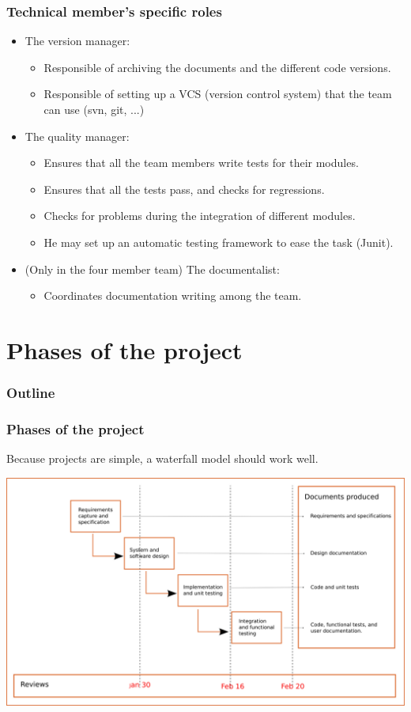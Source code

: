 \documentclass[10pt]{beamer}
\begin{document}
\begin{frame}
  \frametitle{Technical member's specific roles}
  \begin{itemize}
  \item The version manager:
    \begin{itemize}
    \item Responsible of archiving the documents and the different code versions.
    \item Responsible of setting up a VCS (version control system) that the team
      can use (svn, git, ...)
    \end{itemize}
  \item The quality manager:
    \begin{itemize}
    \item Ensures that all the team members write tests for their modules.
    \item Ensures that all the tests pass, and checks for regressions.
    \item Checks for problems during the integration of different modules.
    \item He may set up an automatic testing framework to ease the task (Junit).
    \end{itemize}

  \item (Only in the four member team) The documentalist:
    \begin{itemize}
    \item Coordinates documentation writing among the team.
    \end{itemize}
  \end{itemize}
\end{frame}

\section{Phases of the project}

\begin{frame}
  \frametitle{Outline}
  \tableofcontents[currentsection]
\end{frame}
\begin{frame}
  \frametitle{Phases of the project}
  Because projects are simple, a waterfall model should work well.

  \includegraphics[width=\linewidth]{phases}
\end{frame}
\end{document}
